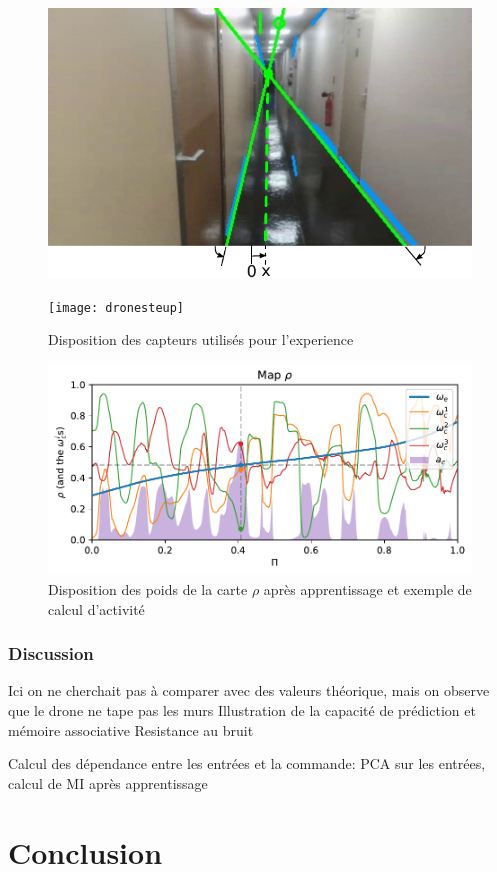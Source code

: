 \documentclass[../main]{subfiles}
\begin{document}
\begin{figure}
\begin{minipage}{0.5\textwidth}
\includegraphics[width=\textwidth]{visudrone}
\end{minipage}
\begin{minipage}{0.5\textwidth}
\texttt{[image: dronesteup]}
\end{minipage}
\caption{Disposition des capteurs utilisés pour l'experience}
\label{fig:drone}
\end{figure}

\begin{figure}
\includegraphics[width=\textwidth]{dronemap}
\caption{Disposition des poids de la carte $\rho$ après apprentissage et exemple de calcul d'activité}
\label{fig:drone_w}
\end{figure}

\subsubsection{Discussion}
Ici on ne cherchait pas à comparer avec des valeurs théorique, mais on observe que le drone ne tape pas les murs
Illustration de la capacité de prédiction et mémoire associative
Resistance au bruit

Calcul des dépendance entre les entrées et la commande:
PCA sur les entrées, calcul de MI après apprentissage

\section{Conclusion}


\ifSubfilesClassLoaded{
    \printbibliography
}{}
\end{document}
